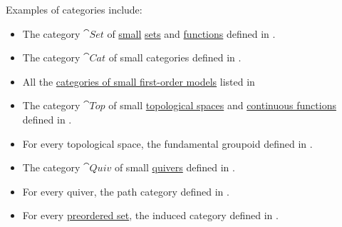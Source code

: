 \begin{example}\label{ex:def:category}
  Examples of categories include:

  \begin{itemize}
    \item The category \( \cat{Set} \) of \hyperref[def:large_and_small_sets]{small} \hyperref[def:set]{sets} and \hyperref[def:function]{functions} defined in .

    \item The category \( \cat{Cat} \) of small categories defined in .

    \item All the \hyperref[def:category_of_first_order_models]{categories of small first-order models} listed in 

    \item The category \( \cat{Top} \) of small \hyperref[def:topological_space]{topological spaces} and \hyperref[def:global_continuity]{continuous functions} defined in .

    \item For every topological space, the fundamental groupoid defined in .

    \item The category \( \cat{Quiv} \) of small \hyperref[def:quiver]{quivers} defined in .

    \item For every quiver, the path category defined in .

    \item For every \hyperref[def:preordered_set]{preordered set}, the induced category defined in .
  \end{itemize}
\end{example}

